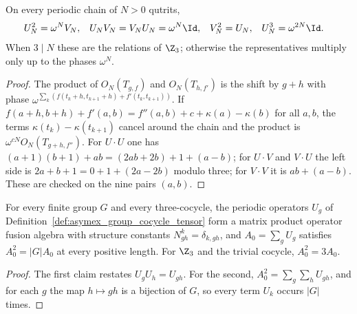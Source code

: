 \begin{lemma}
    \label{thm:asymex_z3clock_table}
    \leanok
    On every periodic chain of $N>0$ qutrits,
    \begin{align}
        U_N^2  & =\omega^N V_N,       &
        U_NV_N & =V_NU_N=\omega^N\Id, &
        V_N^2  & =U_N,                &
        U_N^3  & =\omega^{2N}\Id.
    \end{align}
    When $3\mid N$ these are the relations of $\Z_3$; otherwise the
    representatives multiply only up to the phases $\omega^N$.
\end{lemma}

\begin{proof}
    \leanok
    The product of $O_N(T_{g,f})$ and $O_N(T_{h,f'})$ is the shift by
    $g+h$ with phase
    $\omega^{\sum_k (f(t_k+h,t_{k+1}+h)+f'(t_k,t_{k+1}))}$. If
    $f(a+h,b+h)+f'(a,b)=f''(a,b)+c+\kappa(a)-\kappa(b)$ for all $a,b$, the
    terms $\kappa(t_k)-\kappa(t_{k+1})$ cancel around the chain and the
    product is $\omega^{cN}O_N(T_{g+h,f''})$. For $U\cdot U$ one has
    $(a+1)(b+1)+ab=(2ab+2b)+1+(a-b)$; for $U\cdot V$ and $V\cdot U$ the
    left side is $2a+b+1=0+1+(2a-2b)$ modulo three; for $V\cdot V$ it is
    $ab+(a-b)$. These are checked on the nine pairs $(a,b)$.
\end{proof}

\begin{lemma}
    \label{thm:asymex_group_cocycle_defect}
    \leanok
    For every finite group $G$ and every three-cocycle, the periodic
    operators $U_g$ of Definition~\ref{def:asymex_group_cocycle_tensor}
    form a matrix product operator fusion algebra with structure constants
    $N_{gh}^k=\delta_{k,gh}$, and $A_0=\sum_g U_g$ satisfies $A_0^2=\lvert G\rvert A_0$
    at every positive length. For $\Z_3$ and the trivial cocycle,
    $A_0^2=3A_0$.
\end{lemma}

\begin{proof}
    \leanok
    The first claim restates $U_gU_h=U_{gh}$. For the second,
    $A_0^2=\sum_g\sum_h U_{gh}$, and for each $g$ the map $h\mapsto gh$
    is a bijection of $G$, so every term $U_k$ occurs $\lvert G\rvert$ times.
\end{proof}

